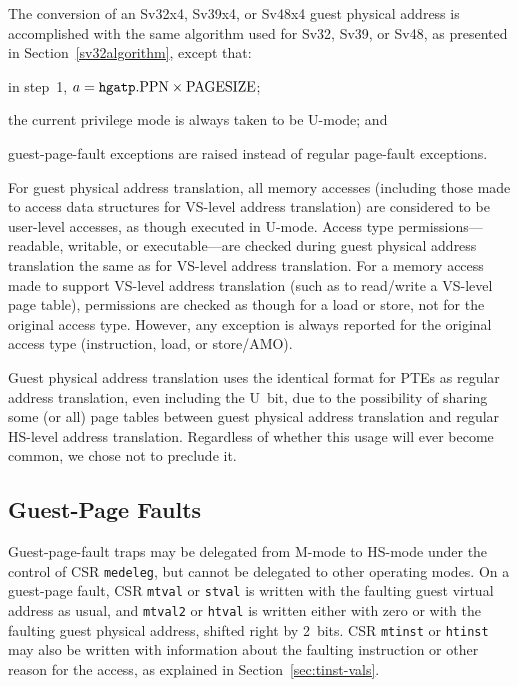 The conversion of an Sv32x4, Sv39x4, or Sv48x4 guest physical address is
accomplished with the same algorithm used for Sv32, Sv39, or Sv48, as presented
in Section~\ref{sv32algorithm}, except that:
\begin{compactitem}
\item
in step~1, $a = \mbox{{\tt hgatp}.PPN}\times\mbox{PAGESIZE}$;
\item
the current privilege mode is always taken to be U-mode; and
\item
guest-page-fault exceptions are raised instead of regular page-fault
exceptions.
\end{compactitem}

For guest physical address translation, all memory accesses (including those
made to access data structures for VS-level address translation) are considered
to be user-level accesses, as though executed in U-mode.
Access type permissions---readable, writable, or executable---are checked
during guest physical address translation the same as for VS-level address
translation.
For a memory access made to support VS-level address translation (such as to
read/write a VS-level page table), permissions are checked as though for a load
or store, not for the original access type.
However, any exception is always reported for the original access type
(instruction, load, or store/AMO).

\begin{commentary}
Guest physical address translation uses the identical format for PTEs as
regular address translation, even including the U~bit, due to the
possibility of sharing some (or all) page tables between guest physical
address translation and regular HS-level address translation.
Regardless of whether this usage will ever become common, we chose not to
preclude it.
\end{commentary}

\subsection{Guest-Page Faults}

Guest-page-fault traps may be delegated from M-mode to HS-mode under the
control of CSR {\tt medeleg}, but cannot be delegated to other operating
modes.
On a guest-page fault, CSR {\tt mtval} or {\tt stval} is written with the
faulting guest virtual address as usual, and {\tt mtval2} or {\tt htval} is
written either with zero or with the faulting guest physical address,
shifted right by 2~bits.
CSR {\tt mtinst} or {\tt htinst} may also be written with information
about the faulting instruction or other reason for the access, as
explained in Section~\ref{sec:tinst-vals}.

